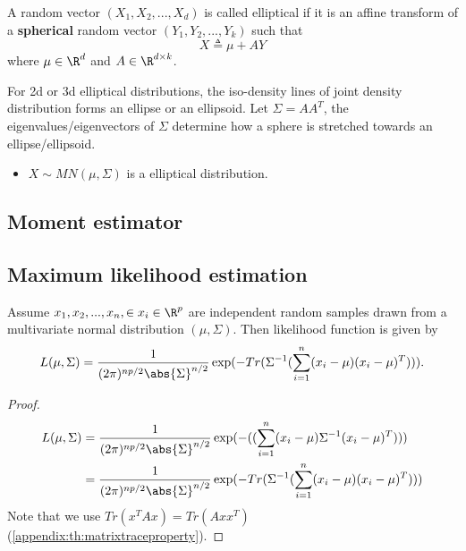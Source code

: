 \begin{refsection}
\begin{definition}\cite[93]{mcneil2015quantitative}
	A random vector $(X_1,X_2,...,X_d)$ is called elliptical if it is an affine transform of a \textbf{spherical} random vector $(Y_1,Y_2,...,Y_k)$ such that
	$$X \triangleq \mu + AY$$	
	where $\mu\in\R^d$ and $A\in \R^{d\times k}$.
\end{definition}


\begin{remark}
	For 2d or 3d elliptical distributions, the iso-density lines of joint density distribution forms an ellipse or an ellipsoid. Let $\Sigma = AA^T$, the eigenvalues/eigenvectors of $\Sigma$ determine how a sphere is stretched towards an ellipse/ellipsoid.
\end{remark}

\begin{example}\hfill
	\begin{itemize}
		\item $X\sim MN(\mu,\Sigma)$ is a elliptical distribution.
	\end{itemize}
\end{example}

\subsection{Moment estimator}

\subsection{Maximum likelihood estimation}

\begin{lemma}
Assume $x_1,x_2,...,x_n, \in x_i\in \R^p$ are independent random samples drawn from a multivariate normal distribution $(\mu,\Sigma)$. Then likelihood function is given by
$$L(\mu,\Sigma) = \frac{1}{(2\pi)^{np/2}\abs{\Sigma}^{n/2}}\exp(-Tr(\Sigma^{-1}(\sum_{i=1}^n (x_i - \mu)(x_i-\mu)^T))).$$
\end{lemma}
\begin{proof}
\begin{align*}
L(\mu,\Sigma) &= \frac{1}{(2\pi)^{np/2}\abs{\Sigma}^{n/2}}\exp(-((\sum_{i=1}^n (x_i - \mu)\Sigma^{-1}(x_i-\mu)^T)))\\
& = \frac{1}{(2\pi)^{np/2}\abs{\Sigma}^{n/2}}\exp(-Tr(\Sigma^{-1}(\sum_{i=1}^n (x_i - \mu)(x_i-\mu)^T)))
\end{align*}
Note that we use $Tr(x^TAx) = Tr(Axx^T)$(\autoref{appendix:th:matrixtraceproperty}).
\end{proof}



\end{refsection}
